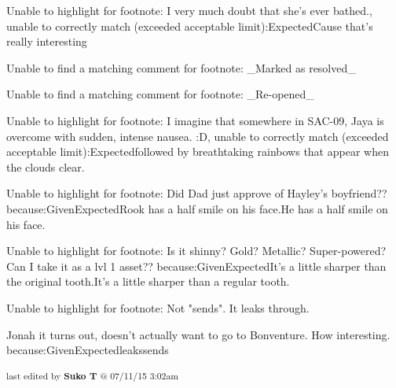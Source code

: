 	Unable to highlight for footnote: I very much doubt that she's ever bathed., unable to correctly match (exceeded acceptable limit):ExpectedCause that’s really interesting

	Unable to find a matching comment for footnote: _Marked as resolved_

	Unable to find a matching comment for footnote: _Re-opened_

	Unable to highlight for footnote: I imagine that somewhere in SAC-09, Jaya is overcome with sudden, intense nausea. :D, unable to correctly match (exceeded acceptable limit):Expectedfollowed by breathtaking rainbows that appear when the clouds clear.

	Unable to highlight for footnote: Did Dad just approve of Hayley's boyfriend?? because:GivenExpectedRook has a half smile on his face.He has a half smile on his face.

	Unable to highlight for footnote: Is it shinny? Gold? Metallic? Super-powered? Can I take it as a lvl 1 asset?? because:GivenExpectedIt’s a little sharper than the original tooth.It’s a little sharper than a regular tooth.

	Unable to highlight for footnote: Not "sends".  It leaks through.

Jonah it turns out, doesn't actually want to go to Bonventure.  How interesting. because:GivenExpectedleakssends


\fi

\vspace{\fill}

\begin{flushright}
\textsubscript{last edited by \textbf{Suko T} @ 07/11/15 3:02am}
\end{flushright}

